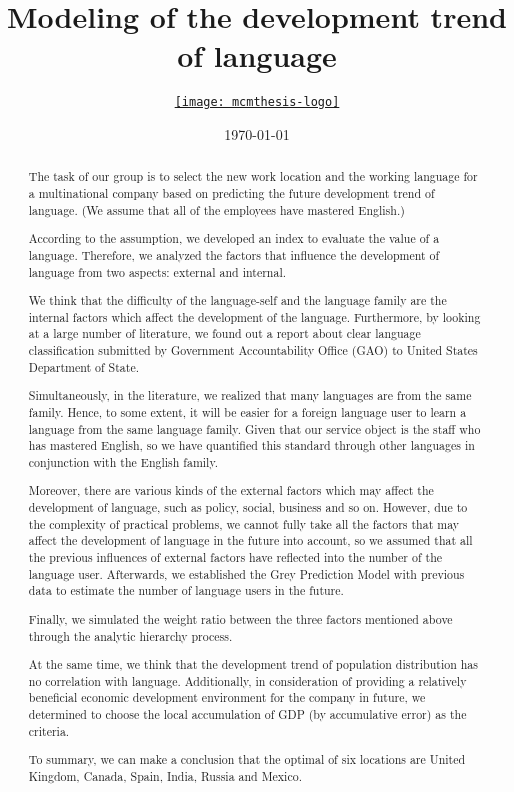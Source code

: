 \documentclass{mcmthesis}
\title{Modeling of the development trend of language}
\author{\small \href{http://www.latexstudio.net/}
  {\texttt{[image: mcmthesis-logo]}}}
\date{\today}
\begin{document}
\begin{abstract}
  The task of our group is to select the new work location and the working language for a multinational company based on predicting the future development trend of language.  (We assume that all of the employees have mastered English.)

  According to the assumption, we developed an index to evaluate the value of a language. Therefore, we analyzed the factors that influence the development of language from two aspects: external and internal.

  We think that the difficulty of the language-self and the language family are the internal factors which affect the development of the language. Furthermore, by looking at a large number of literature, we found out a report about clear language classification submitted by Government Accountability Office (GAO) to United States Department of State.

  Simultaneously, in the literature, we realized that many languages are from the same family. Hence, to some extent, it will be easier for a foreign language user to learn a language from the same language family. Given that our service object is the staff who has mastered English, so we have quantified this standard through other languages in conjunction with the English family.

  Moreover, there are various kinds of the external factors which may affect the development of language, such as policy, social, business and so on. However, due to the complexity of practical problems, we cannot fully take all the factors that may affect the development of language in the future into account, so we assumed that all the previous influences of external factors have reflected into the number of the language user. Afterwards, we established the Grey Prediction Model with previous data to estimate the number of language users in the future.

  Finally, we simulated the weight ratio between the three factors mentioned above through the analytic hierarchy process.

  At the same time, we think that the development trend of population distribution has no correlation with language. Additionally, in consideration of providing a relatively beneficial economic development environment for the company in future, we determined to choose the local accumulation of GDP (by accumulative error) as the criteria.

  To summary, we can make a conclusion that the optimal of six locations are United Kingdom, Canada, Spain, India, Russia and Mexico.


\end{abstract}
\end{document}
